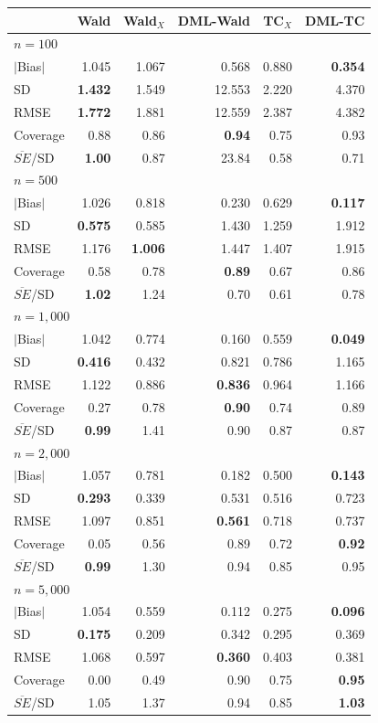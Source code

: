 \begin{tabular}{lrrrrr}
\toprule
 & Wald & Wald$_X$ & DML-Wald & TC$_X$ & DML-TC \\
\midrule
\multicolumn{6}{l}{$n = 100$} \\
\quad $|$Bias$|$ & 1.045 & 1.067 & 0.568 & 0.880 & \textbf{0.354} \\
\quad SD & \textbf{1.432} & 1.549 & 12.553 & 2.220 & 4.370 \\
\quad RMSE & \textbf{1.772} & 1.881 & 12.559 & 2.387 & 4.382 \\
\quad Coverage & 0.88 & 0.86 & \textbf{0.94} & 0.75 & 0.93 \\
\quad $\overline{SE}$/SD & \textbf{1.00} & 0.87 & 23.84 & 0.58 & 0.71 \\
\midrule
\multicolumn{6}{l}{$n = 500$} \\
\quad $|$Bias$|$ & 1.026 & 0.818 & 0.230 & 0.629 & \textbf{0.117} \\
\quad SD & \textbf{0.575} & 0.585 & 1.430 & 1.259 & 1.912 \\
\quad RMSE & 1.176 & \textbf{1.006} & 1.447 & 1.407 & 1.915 \\
\quad Coverage & 0.58 & 0.78 & \textbf{0.89} & 0.67 & 0.86 \\
\quad $\overline{SE}$/SD & \textbf{1.02} & 1.24 & 0.70 & 0.61 & 0.78 \\
\midrule
\multicolumn{6}{l}{$n = 1,000$} \\
\quad $|$Bias$|$ & 1.042 & 0.774 & 0.160 & 0.559 & \textbf{0.049} \\
\quad SD & \textbf{0.416} & 0.432 & 0.821 & 0.786 & 1.165 \\
\quad RMSE & 1.122 & 0.886 & \textbf{0.836} & 0.964 & 1.166 \\
\quad Coverage & 0.27 & 0.78 & \textbf{0.90} & 0.74 & 0.89 \\
\quad $\overline{SE}$/SD & \textbf{0.99} & 1.41 & 0.90 & 0.87 & 0.87 \\
\midrule
\multicolumn{6}{l}{$n = 2,000$} \\
\quad $|$Bias$|$ & 1.057 & 0.781 & 0.182 & 0.500 & \textbf{0.143} \\
\quad SD & \textbf{0.293} & 0.339 & 0.531 & 0.516 & 0.723 \\
\quad RMSE & 1.097 & 0.851 & \textbf{0.561} & 0.718 & 0.737 \\
\quad Coverage & 0.05 & 0.56 & 0.89 & 0.72 & \textbf{0.92} \\
\quad $\overline{SE}$/SD & \textbf{0.99} & 1.30 & 0.94 & 0.85 & 0.95 \\
\midrule
\multicolumn{6}{l}{$n = 5,000$} \\
\quad $|$Bias$|$ & 1.054 & 0.559 & 0.112 & 0.275 & \textbf{0.096} \\
\quad SD & \textbf{0.175} & 0.209 & 0.342 & 0.295 & 0.369 \\
\quad RMSE & 1.068 & 0.597 & \textbf{0.360} & 0.403 & 0.381 \\
\quad Coverage & 0.00 & 0.49 & 0.90 & 0.75 & \textbf{0.95} \\
\quad $\overline{SE}$/SD & 1.05 & 1.37 & 0.94 & 0.85 & \textbf{1.03} \\
\bottomrule
\end{tabular}
